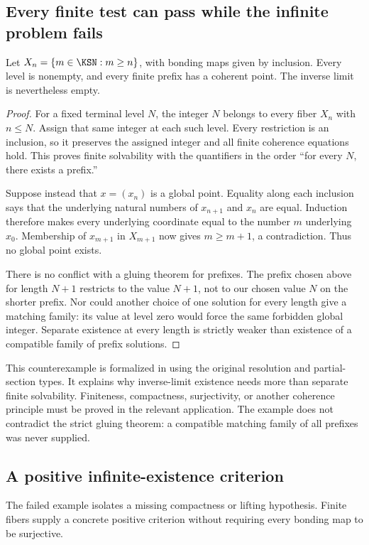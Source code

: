 \subsection{Every finite test can pass while the infinite problem fails}
\begin{KSexample}\label{KS:KS54}
Let \(X_n=\{m\in\KSN:m\ge n\}\), with bonding maps given by inclusion. Every level is nonempty, and every finite prefix has a coherent point. The inverse limit is nevertheless empty.
\end{KSexample}
\begin{proof}
For a fixed terminal level \(N\), the integer \(N\) belongs to every fiber \(X_n\) with \(n\le N\). Assign that same integer at each such level. Every restriction is an inclusion, so it preserves the assigned integer and all finite coherence equations hold. This proves finite solvability with the quantifiers in the order ``for every \(N\), there exists a prefix.''

Suppose instead that \(x=(x_n)\) is a global point. Equality along each inclusion says that the underlying natural numbers of \(x_{n+1}\) and \(x_n\) are equal. Induction therefore makes every underlying coordinate equal to the number \(m\) underlying \(x_0\). Membership of \(x_{m+1}\) in \(X_{m+1}\) now gives \(m\ge m+1\), a contradiction. Thus no global point exists.

There is no conflict with a gluing theorem for prefixes. The prefix chosen above for length \(N+1\) restricts to the value \(N+1\), not to our chosen value \(N\) on the shorter prefix. Nor could another choice of one solution for every length give a matching family: its value at level zero would force the same forbidden global integer. Separate existence at every length is strictly weaker than existence of a compatible family of prefix solutions.
\end{proof}
This counterexample is formalized in  using the original resolution and partial-section types. It explains why inverse-limit existence needs more than separate finite solvability. Finiteness, compactness, surjectivity, or another coherence principle must be proved in the relevant application. The example does not contradict the strict gluing theorem: a compatible matching family of all prefixes was never supplied.

\subsection{A positive infinite-existence criterion}
The failed example isolates a missing compactness or lifting hypothesis. Finite fibers supply a concrete positive criterion without requiring every bonding map to be surjective.

